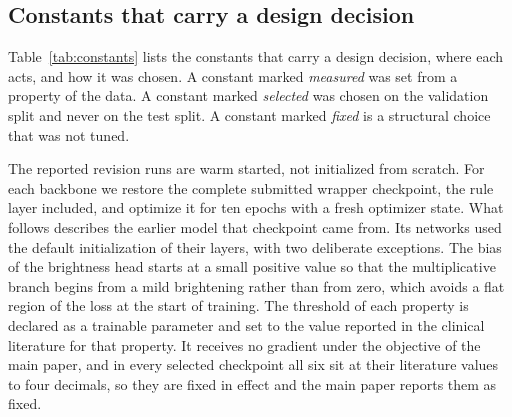 \subsection{Constants that carry a design decision}
\label{sec:supp_constants_design}
Table~\ref{tab:constants} lists the constants that carry a design decision, where each acts, and how
it was chosen. A constant marked \emph{measured} was set from a property of the data. A constant
marked \emph{selected} was chosen on the validation split and never on the test split. A constant
marked \emph{fixed} is a structural choice that was not tuned.

The reported revision runs are warm started, not initialized from scratch. For each backbone we
restore the complete submitted wrapper checkpoint, the rule layer included, and optimize it for ten
epochs with a fresh optimizer state. What follows describes the earlier model that checkpoint came
from. Its networks used the default initialization of their layers, with two deliberate exceptions. The bias
of the brightness head starts at a small positive value so that the multiplicative branch begins from
a mild brightening rather than from zero, which avoids a flat region of the loss at the start of
training. The threshold of each property is declared as a trainable parameter and set to the value reported in
the clinical literature for that property. It receives no gradient under the objective of the main
paper, and in every selected checkpoint all six sit at their literature values to four decimals, so
they are fixed in effect and the main paper reports them as fixed.

